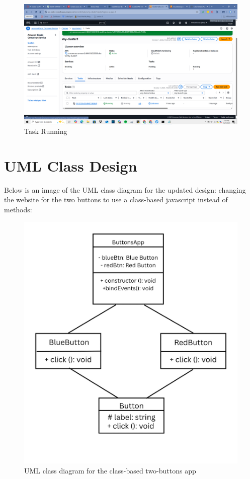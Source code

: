 \begin{figure}
    \centering
    \includegraphics[width=0.6\linewidth]{Book_SSW590_1/eps/Screenshots/TaskRunning.png}
    \caption{Task Running}
    \label{fig:Tasking Running}
\end{figure}

\section{UML Class Design}
Below is an image of the UML class diagram for the updated design: changing the website for the two buttons to use a class-based javascript instead of methods: 

\begin{figure}[htbp]
\centering
\includegraphics[width=0.85\linewidth]{uml_diagram.jpg}
\caption{UML class diagram for the class-based two-buttons app}
\label{fig:uml-diagram}
\end{figure}